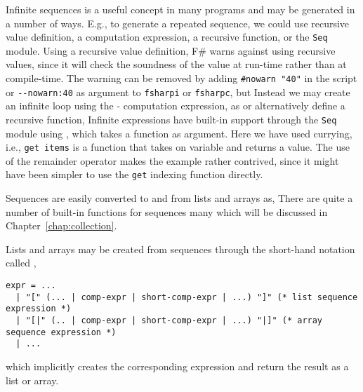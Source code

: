 Infinite sequences is a useful concept in many programs and may be generated in a number of ways. E.g., to generate a repeated sequence, we could use recursive value definition, a computation expression, a recursive function, or the \lstinline!Seq! module. Using a recursive value definition,
%
%
F\# warns against using recursive values, since it will check the soundness of the value at run-time rather than at compile-time. The warning can be removed by adding \lstinline!#nowarn "40"! in the script or \lstinline!--nowarn:40! as argument to \lstinline[language=console]!fsharpi! or \lstinline[language=console]!fsharpc!, but  Instead we may create an infinite loop using the - computation expression, as
%
%
or alternatively define a recursive function,
%
%
Infinite expressions have built-in support through the \lstinline!Seq! module using ,
%
%
which takes a function as argument. Here we have used currying, i.e., \lstinline!get items! is a function that takes on variable and returns a value. The use of the remainder operator makes the example rather contrived, since it might have been simpler to use the \lstinline!get! indexing function directly.

Sequences are easily converted to and from lists and arrays as,
%
%
There are quite a number of built-in functions for sequences many which will be discussed in Chapter~\ref{chap:collection}.
 
Lists and arrays may be created from sequences through the short-hand notation called ,
\begin{lstlisting}[language=ebnf]
expr = ... 
  | "[" (... | comp-expr | short-comp-expr | ...) "]" (* list sequence expression *)
  | "[|" (.. | comp-expr | short-comp-expr | ...) "|]" (* array sequence expression *)
  | ...
\end{lstlisting}
which implicitly creates the corresponding expression and return the result as a list or array.

